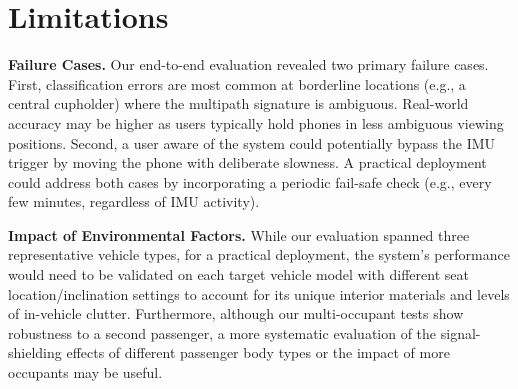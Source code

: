 \documentclass[sigconf]{acmart}
\newcommand{\edited}[1]{#1}
\begin{document}
\vspace{-0.05in}
\section{\edited{Limitations}}


\edited{\textbf{Failure Cases.}} \edited{Our end-to-end evaluation revealed two primary failure cases. First, classification errors are most common at borderline locations (e.g., a central cupholder) where the multipath signature is ambiguous. Real-world accuracy may be higher as users typically hold phones in less ambiguous viewing positions. Second, a user aware of the system could potentially bypass the IMU trigger by moving the phone with deliberate slowness. A practical deployment could address both cases by incorporating a periodic fail-safe check (e.g., every few minutes, regardless of IMU activity).}

\noindent
\edited{\textbf{Impact of Environmental Factors.}
While our evaluation spanned three representative vehicle types, for a 
practical deployment, the system's performance would need to be validated 
on each target vehicle model with different seat location/inclination 
settings to account for its unique interior materials and levels of
in-vehicle clutter. Furthermore, although our multi-occupant tests 
show robustness to a second passenger, a more systematic evaluation of
the signal-shielding effects of different passenger body types
or the impact of more occupants may be useful.}
\end{document}
